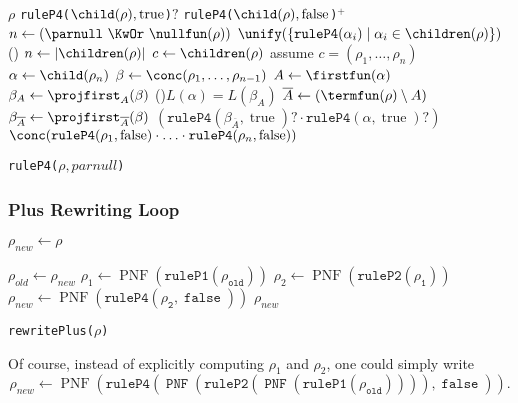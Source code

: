 \documentclass[a4paper,11pt, svgnames,titlepage]{article}
\newcommand{\rxp}{{^\mathtt{+}}}
\newcommand{\rxo}{\mathtt{?}}
\newcommand{\rxc}{\cdot}
\DeclareMathOperator{\pnf}{PNF}
\newcommand{\true}{\ensuremath{\operatorname{true}}\xspace}
\newcommand{\false}{\ensuremath{\operatorname{false}}\xspace}
\begin{document}
\begin{algorithm2e}[H]
	\SetAlgoLined

		{\Return $\rho$}
		{\Return \texttt{ruleP4(}$\child(\rho),\true$\texttt{)}$\rxo$}
		{\Return \texttt{ruleP4(}$\child(\rho),\false$\texttt{)}$\rxp$}
	{
		$n\leftarrow (\parnull\ \KwOr\ \nullfun(\rho))$\;
		\Return $\unify(\{\mathtt{ruleP4(}\alpha_i\mathtt{)}\mid \alpha_i\in\children(\rho)\})$\;
	}
	\Else()
	{
		$n\leftarrow |\children(\rho)|$\;
		$c\leftarrow \children(\rho)$\;
		assume $c=(\rho_1,\ldots,\rho_n)$\;
		{
			$\alpha\leftarrow \child(\rho_n)$\;
			$\beta\leftarrow \conc(\rho_1,\ldots,\rho_{n-1})$\;
			$A\leftarrow \firstfun(\alpha)$\; 
			$\beta_A\leftarrow \projfirst_{A}(\beta)$\;			
			\If(){$L(\alpha)=L(\beta_A)$}
			{
				$\overline{A}\leftarrow (\termfun(\rho)\setminus A)$\; 
				$\beta_{\overline{A}}\leftarrow \projfirst_{\overline{A}}(\beta)$\;
				\Return $(\mathtt{ruleP4}(\beta_{\overline{A}},\true)\rxo \rxc \mathtt{ruleP4}(\alpha,\true)\rxo)$\;
			}
		}
		\Return $\conc(\mathtt{ruleP4}(\rho_{1},\false)\rxc \ldots \rxc \mathtt{ruleP4}(\rho_{n},\false))$\;
	}
	\caption{\texttt{ruleP4(}$\rho,parnull$\texttt{)}}
\end{algorithm2e}

\subsubsection{Plus Rewriting Loop}\label{sec:prl}

\begin{algorithm2e}[H]
	\SetAlgoLined

	$\rho_{new}\leftarrow \rho$\;

	{
		$\rho_{old}\leftarrow \rho_{new}$\;
		$\rho_{1}\leftarrow \pnf(\mathtt{ruleP1(\rho_{old})})$\;
		$\rho_{2}\leftarrow \pnf(\mathtt{ruleP2(\rho_{1})})$\;
		$\rho_{new}\leftarrow \pnf(\mathtt{ruleP4(\rho_{2},\false)})$\;
	}
	\Return $\rho_{new}$\;
	\caption{\texttt{rewritePlus(}$\rho$\texttt{)}}
\end{algorithm2e}
Of course, instead of explicitly computing $\rho_{1}$ and $\rho_{2}$, one could simply write
\[\rho_{new}\leftarrow \pnf(\mathtt{ruleP4(\pnf(\mathtt{ruleP2(\pnf(\mathtt{ruleP1(\rho_{old})}))}),\false)}).\]
\end{document}
